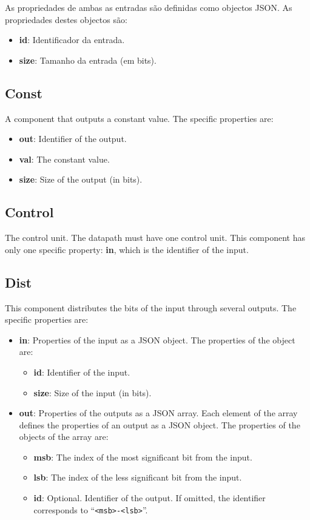 \documentclass[11pt,a4paper,twoside,titlepage]{report}
\begin{document}
As propriedades de ambas as entradas são definidas como objectos JSON. As
propriedades destes objectos são:
\begin{itemize}
	\item \textbf{id}: Identificador da entrada.
	\item \textbf{size}: Tamanho da entrada (em bits).
\end{itemize}

\subsection{Const}

A component that outputs a constant value. The specific properties are:
\begin{itemize}
	\item \textbf{out}: Identifier of the output.
	\item \textbf{val}: The constant value.
	\item \textbf{size}: Size of the output (in bits).
\end{itemize}

\subsection{Control}

The control unit. The datapath must have one control unit.
This component has only one specific property: \textbf{in}, which is
the identifier of the input.

\subsection{Dist}

This component distributes the bits of the input through several outputs.
The specific properties are:
\begin{itemize}
	\item \textbf{in}: Properties of the input as a JSON object.
		The properties of the object are:
		\begin{itemize}
			\item \textbf{id}: Identifier of the input.
			\item \textbf{size}: Size of the input (in bits).
		\end{itemize}
	\item \textbf{out}: Properties of the outputs as a JSON array.
		Each element of the array defines the properties of an output as a
		JSON object. The properties of the objects of the array are:
		\begin{itemize}
			\item \textbf{msb}: The index of the most significant bit from the input.
			\item \textbf{lsb}: The index of the less significant bit from the input.
			\item \textbf{id}: Optional. Identifier of the output. If omitted,
				the identifier corresponds to ``\verb+<msb>-<lsb>+''.
		\end{itemize}
\end{itemize}
\end{document}
